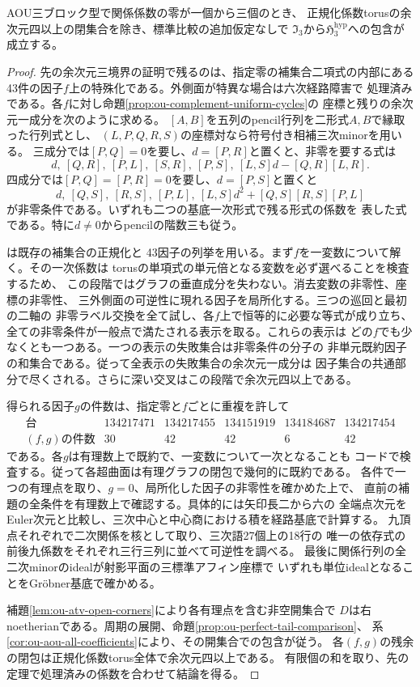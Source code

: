 \begin{theorem}[一から三零での余次元四境界]
\label{thm:ou-small-zero-codim-four}
AOU三ブロック型で関係係数の零が一個から三個のとき、
正規化係数torusの余次元四以上の閉集合を除き、標準比較の追加仮定なしで
$\mathfrak I_3$から$\mathfrak H^{\mathrm{hyp}}_3$への包含が成立する。
\end{theorem}
\begin{proof}
先の余次元三境界の証明で残るのは、指定零の補集合二項式の内部にある
43件の因子$f$上の特殊化である。外側面が特異な場合は六次経路障害で
処理済みである。各$f$に対し命題\ref{prop:ou-complement-uniform-cycles}の
座標と残りの余次元一成分を次のように求める。
$[A,B]$を五列のpencil行列を二形式$A,B$で縁取った行列式とし、
$(L,P,Q,R,S)$の座標対なら符号付き相補三次minorを用いる。
三成分では$[P,Q]=0$を要し、$d=[P,R]$と置くと、非零を要する式は
\[
 d,\ [Q,R],\ [P,L],\ [S,R],\ [P,S],\ [L,S]d-[Q,R][L,R].
\]
四成分では$[P,Q]=[P,R]=0$を要し、$d=[P,S]$と置くと
\[
 d,\ [Q,S],\ [R,S],\ [P,L],\ [L,S]d^2+[Q,S][R,S][P,L]
\]
が非零条件である。いずれも二つの基底一次形式で残る形式の係数を
表した式である。特に$d\ne0$からpencilの階数三も従う。

は既存の補集合の正規化と
43因子の列挙を用いる。まず$f$を一変数について解く。その一次係数は
torusの単項式の単元倍となる変数を必ず選べることを検査するため、
この段階ではグラフの垂直成分を失わない。消去変数の非零性、座標の非零性、
三外側面の可逆性に現れる因子を局所化する。三つの巡回と最初の二軸の
非零ラベル交換を全て試し、各$f$上で恒等的に必要な等式が成り立ち、
全ての非零条件が一般点で満たされる表示を取る。これらの表示は
どの$f$でも少なくとも一つある。一つの表示の失敗集合は非零条件の分子の
非単元既約因子の和集合である。従って全表示の失敗集合の余次元一成分は
因子集合の共通部分で尽くされる。さらに深い交叉はこの段階で余次元四以上である。

得られる因子$g$の件数は、指定零と$f$ごとに重複を許して
\[
\begin{array}{c|rrrrr}
\text{台}&134217471&134217455&134151919&134184687&134217454\\\hline
(f,g)\text{の件数}&30&42&42&6&42
\end{array}
\]
である。各$g$は有理数上で既約で、一変数について一次となることも
コードで検査する。従って各超曲面は有理グラフの閉包で幾何的に既約である。
各件で一つの有理点を取り、$g=0$、局所化した因子の非零性を確かめた上で、
直前の補題の全条件を有理数上で確認する。具体的には矢印長二から六の
全端点次元をEuler次元と比較し、三次中心と中心商における積を経路基底で計算する。
九頂点それぞれで二次関係を核として取り、三次語27個上の18行の
唯一の依存式の前後九係数をそれぞれ三行三列に並べて可逆性を調べる。
最後に関係行列の全二次minorのidealが射影平面の三標準アフィン座標で
いずれも単位idealとなることをGröbner基底で確かめる。

補題\ref{lem:ou-atv-open-corners}により各有理点を含む非空開集合で
$D$は右noetherianである。周期の展開、命題\ref{prop:ou-perfect-tail-comparison}、
系\ref{cor:ou-aou-all-coefficients}により、その開集合での包含が従う。
各$(f,g)$の残余の閉包は正規化係数torus全体で余次元四以上である。
有限個の和を取り、先の定理で処理済みの係数を合わせて結論を得る。
\end{proof}

